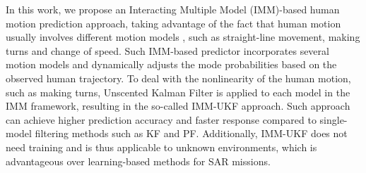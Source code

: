 \documentclass[letterpaper, 10 pt, conference]{ieeeconf}
\begin{document}
	In this work, we propose an Interacting Multiple Model (IMM)-based human motion prediction approach, taking advantage of the fact that human motion usually involves different motion models \cite{aggarwal1999human}, such as straight-line movement, making turns and change of speed.
	Such IMM-based predictor incorporates several motion models and dynamically adjusts the mode probabilities based on the observed human trajectory.
	To deal with the nonlinearity of the human motion, such as making turns, Unscented Kalman Filter is applied to each model in the IMM framework, resulting in the so-called IMM-UKF approach.
	Such approach can achieve higher prediction accuracy and faster response compared to single-model filtering methods such as KF and PF. 
	Additionally, IMM-UKF does not need training and is thus applicable to unknown environments, which is advantageous over learning-based methods for SAR missions.
	
\end{document}

